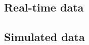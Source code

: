 \documentclass[11pt,openright]{report}
\begin{document}
\subsection{Real-time data}

\subsection{Simulated data}




%
%
%
%
%
%
%
%
%
%
%
\end{document}
